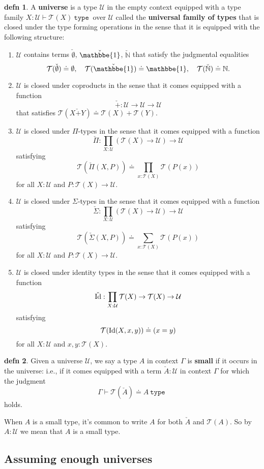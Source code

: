 \documentclass{amsart}
\theoremstyle{theorem}
\theoremstyle{definition}
\newtheorem*{defn}{defn}
\theoremstyle{remark}
\newcommand{\0}{\mathbbe{0}}
\newcommand{\1}{\mathbbe{1}}
\newcommand{\2}{\mathbbe{2}}
\newcommand{\3}{\mathbbe{3}}
\newcommand{\4}{\mathbbe{4}}
\newcommand{\univ}{{~\texttt{type}~}}
\newcommand{\bN}{{\mathbb{N}}}
\newcommand{\UU}{{\mathcal{U}}}
\newcommand{\sT}{\mathcal{T}}
\newcommand{\Id}{\textup{\text{Id}}}
\begin{document}
\begin{defn} A \textbf{universe} is a type $\UU$ in the empty context equipped with a type family $X : \UU \vdash \sT(X) \univ$ over $\UU$ called the \textbf{universal family of types} that is closed under the type forming operations in the sense that it is equipped with the following structure:
\begin{enumerate}
\item $\UU$ contains terms $\check{\emptyset}$, $\check{\1}$, $\check{\bN}$ that satisfy the judgmental equalities
\[ \sT(\check{\emptyset}) \doteq \emptyset, \quad \sT(\check{\1}) \doteq \1, \quad \sT(\check{\bN}) \doteq \bN.\]
\item $\UU$ is closed under coproducts in the sense that it comes equipped with a function
\[ \check{+} \colon \UU \to \UU \to \UU\] that satisfies $\sT(X\check{+}Y) \doteq \sT(X) + \sT(Y)$.
\item $\UU$ is closed under $\Pi$-types in the sense that it comes equipped with a function
\[ \check{\Pi} \colon \prod_{X: \UU} (\sT(X) \to \UU) \to \UU\] satisfying
\[ \sT(\check{\Pi}(X,P)) \doteq \prod_{x : \sT(X)} \sT(P(x))\]
for all $X : \UU$ and $P \colon \sT(X) \to \UU$.
\item $\UU$ is closed under $\Sigma$-types in the sense that it comes equipped with a function
\[ \check{\Sigma} \colon \prod_{X: \UU} (\sT(X) \to \UU) \to \UU\] satisfying
\[ \sT(\check{\Sigma}(X,P)) \doteq \sum_{x : \sT(X)} \sT(P(x))\]
for all $X : \UU$ and $P \colon \sT(X) \to \UU$.
\item $\UU$ is closed under identity types in the sense that it comes equipped with a function
\[ \check{\Id} : \prod_{X : \UU} \sT(X) \to \sT(X) \to \UU\]
satisfying
\[ \sT(\Id(X,x,y)) \doteq (x = y)\]
for all $X: \UU$ and $x,y : \sT(X)$.
\end{enumerate}
\end{defn} 

\begin{defn} Given a universe $\UU$, we say a type $A$ in context $\Gamma$ is \textbf{small} if it occurs in the universe: i.e., if it comes equipped with a term $\check{A} : \UU$ in context $\Gamma$ for which the judgment
\[ \Gamma \vdash \sT(\check{A}) \doteq A \univ\]
holds. 
\end{defn}

When $A$ is a small type, it's common to write $A$ for both $\check{A}$ and $\sT(A)$. So by $A : \UU$ we mean that $A$ is a small type.

\subsection*{Assuming enough universes}
\end{document}
